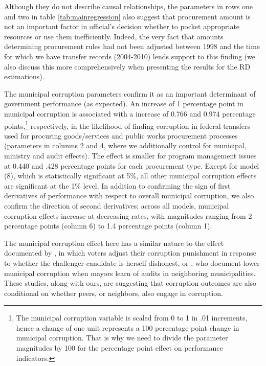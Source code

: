 \documentclass[11pt]{article}
\begin{document}
Although they do not describe causal relationships, the parameters in rows one and two in table \ref{tab:mainregression} also suggest that procurement amount is not an important factor in official's decision whether to pocket appropriate resources or use them inefficiently. Indeed, the very fact that amounts determining procurement rules had not been adjusted between 1998 and the time for which we have transfer records (2004-2010) lends support to this finding (we also discuss this more comprehensively when presenting the results for the RD estimations).

The municipal corruption parameters confirm it as an important determinant of government performance (as expected). An increase of 1 percentage point in municipal corruption is associated with a increase of 0.766 and 0.974 percentage points,\footnote{The municipal corruption variable is scaled from 0 to 1 in .01 increments, hence a change of one unit represents a 100 percentage point change in municipal corruption. That is why we need to divide the parameter magnitudes by 100 for the percentage point effect on performance indicators.} respectively, in the likelihood of finding corruption in federal transfers used for procuring goods/services and public works procurement processes (parameters in columns 2 and 4, where we additionally control for municipal, ministry and audit effects). The effect is smaller for program management issues at 0.440 and .428 percentage points for each procurement type. Except for model (8), which is statistically significant at 5\%, all other municipal corruption effects are significant at the 1\% level. In addition to confirming the sign of first derivatives of performance with respect to overall municipal corruption, we also confirm the direction of second derivatives; across all models, municipal corruption effects increase at decreasing rates, with magnitudes ranging from 2 percentage points (column 6) to 1.4 percentage points (column 1).

The municipal corruption effect here has a similar nature to the effect documented by \citet{ChongDoesCorruptionInformation2015}, in which voters adjust their corruption punishment in response to whether the challenger candidate is herself dishonest, or \citet{AvisGovernmentAuditsReduce2018}, who document lower municipal corruption when mayors learn of audits in neighboring municipalities. These studies, along with ours, are suggesting that corruption outcomes are also conditional on whether peers, or neighbors, also engage in corruption.
\end{document}

